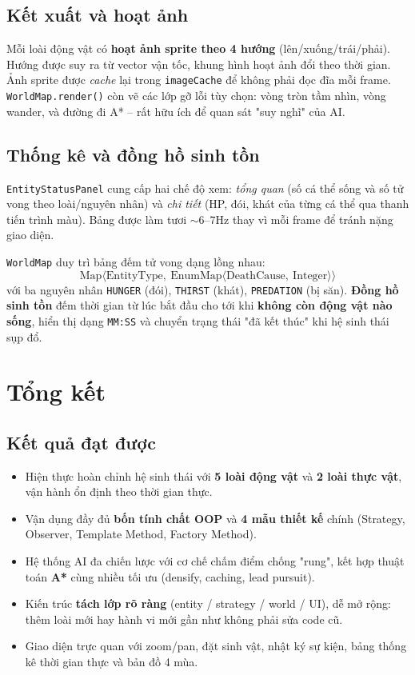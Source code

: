 \documentclass[12pt,a4paper]{report}
\newcommand{\keyword}[1]{\textcolor{primaryblue}{\textbf{#1}}}
\newcommand{\code}[1]{\texttt{\small #1}}
\begin{document}
\section{Kết xuất và hoạt ảnh}

Mỗi loài động vật có \keyword{hoạt ảnh sprite theo 4 hướng} (lên/xuống/trái/phải). Hướng được suy ra từ vector vận tốc, khung hình hoạt ảnh đổi theo thời gian. Ảnh sprite được \textit{cache} lại trong \code{imageCache} để không phải đọc đĩa mỗi frame. \code{WorldMap.render()} còn vẽ các lớp gỡ lỗi tùy chọn: vòng tròn tầm nhìn, vòng wander, và đường đi A* -- rất hữu ích để quan sát "suy nghĩ" của AI.

\section{Thống kê và đồng hồ sinh tồn}

\code{EntityStatusPanel} cung cấp hai chế độ xem: \textit{tổng quan} (số cá thể sống và số tử vong theo loài/nguyên nhân) và \textit{chi tiết} (HP, đói, khát của từng cá thể qua thanh tiến trình màu). Bảng được làm tươi $\sim6$--$7$Hz thay vì mỗi frame để tránh nặng giao diện.

\code{WorldMap} duy trì bảng đếm tử vong dạng lồng nhau:
\[
\text{Map}\langle\text{EntityType},\ \text{EnumMap}\langle\text{DeathCause},\ \text{Integer}\rangle\rangle
\]
với ba nguyên nhân \code{HUNGER} (đói), \code{THIRST} (khát), \code{PREDATION} (bị săn). \keyword{Đồng hồ sinh tồn} đếm thời gian từ lúc bắt đầu cho tới khi \textbf{không còn động vật nào sống}, hiển thị dạng \code{MM:SS} và chuyển trạng thái "đã kết thúc" khi hệ sinh thái sụp đổ.

\chapter{Tổng kết}

\section{Kết quả đạt được}

\begin{itemize}[leftmargin=1.5em]
    \item Hiện thực hoàn chỉnh hệ sinh thái với \keyword{5 loài động vật} và \keyword{2 loài thực vật}, vận hành ổn định theo thời gian thực.
    \item Vận dụng đầy đủ \keyword{bốn tính chất OOP} và \keyword{4 mẫu thiết kế} chính (Strategy, Observer, Template Method, Factory Method).
    \item Hệ thống AI đa chiến lược với cơ chế chấm điểm chống "rung", kết hợp thuật toán \keyword{A*} cùng nhiều tối ưu (densify, caching, lead pursuit).
    \item Kiến trúc \keyword{tách lớp rõ ràng} (entity / strategy / world / UI), dễ mở rộng: thêm loài mới hay hành vi mới gần như không phải sửa code cũ.
    \item Giao diện trực quan với zoom/pan, đặt sinh vật, nhật ký sự kiện, bảng thống kê thời gian thực và bản đồ 4 mùa.
\end{itemize}
\end{document}
